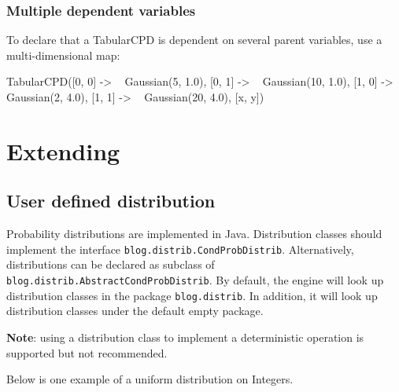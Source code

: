 \documentclass[12pt]{article}
\begin{document}
\subsubsection{Multiple dependent variables}
To declare that a TabularCPD is dependent on several parent variables, use a multi-dimensional map:
\begin{blogcode}
TabularCPD({[0, 0] -> ~ Gaussian(5, 1.0), 
            [0, 1] -> ~ Gaussian(10, 1.0),
            [1, 0] -> ~ Gaussian(2, 4.0),
            [1, 1] -> ~ Gaussian(20, 4.0)}, [x, y])
\end{blogcode}



\section{Extending \bl}
\subsection{User defined distribution}
Probability distributions are implemented in Java.  Distribution classes should implement the interface \verb|blog.distrib.CondProbDistrib|.
Alternatively, distributions can be declared as subclass of \verb|blog.distrib.AbstractCondProbDistrib|. 
By default, the \bl engine will look up distribution classes in the package \verb|blog.distrib|. In addition, it will look up distribution classes under the default empty package. 

{\bf Note}: using a distribution class to implement a deterministic operation is supported but not recommended. 

Below is one example of a uniform distribution on Integers.
\end{document}
